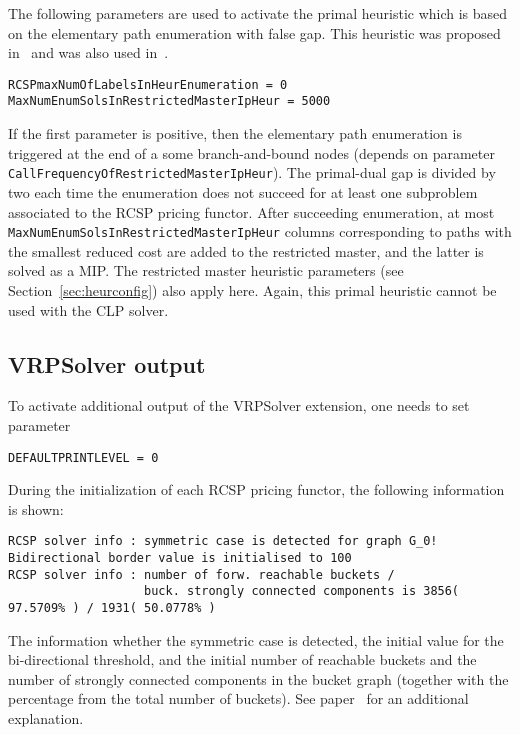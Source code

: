 \documentclass[10pt,a4paper]{article}
\begin{document}
The following parameters are used to activate the primal heuristic which is based on the elementary path enumeration with
false gap. This heuristic was proposed in~\cite{PessoaUchoaPoggi-de-:09a} and was also used
in~\cite{QueirogaSadykovUchoa:21o}.
\begin{lstlisting}
RCSPmaxNumOfLabelsInHeurEnumeration = 0
MaxNumEnumSolsInRestrictedMasterIpHeur = 5000
\end{lstlisting}
If the first parameter is positive, then the elementary path enumeration is triggered at the end of a some branch-and-bound
nodes (depends on parameter \verb+CallFrequencyOfRestrictedMasterIpHeur+). The primal-dual gap is divided by two each
time the enumeration does not succeed for at least one subproblem associated to the RCSP pricing functor. After
succeeding enumeration, at most \verb+MaxNumEnumSolsInRestrictedMasterIpHeur+ columns corresponding to paths with the
smallest reduced cost are added to the restricted master, and the latter is solved as a MIP. The restricted master
heuristic parameters (see Section~\ref{sec:heurconfig}) also apply here. Again, this primal heuristic cannot be used with the CLP solver.

\subsection{VRPSolver output}

To activate additional output of the VRPSolver extension, one needs to set parameter
\begin{lstlisting}
DEFAULTPRINTLEVEL = 0
\end{lstlisting}

During the initialization of each RCSP pricing functor, the following information is shown:
\scriptsize
\begin{verbatim}
RCSP solver info : symmetric case is detected for graph G_0!
Bidirectional border value is initialised to 100
RCSP solver info : number of forw. reachable buckets / 
                   buck. strongly connected components is 3856( 97.5709% ) / 1931( 50.0778% )
\end{verbatim}
\normalsize The information whether the symmetric case is detected, the initial value for the bi-directional threshold,
and the initial number of reachable buckets and the number of strongly connected components in the bucket graph
(together with the percentage from the total number of buckets). See paper~\cite{SadykovUchoaPessoa:21l} for an
additional explanation.
\end{document}

